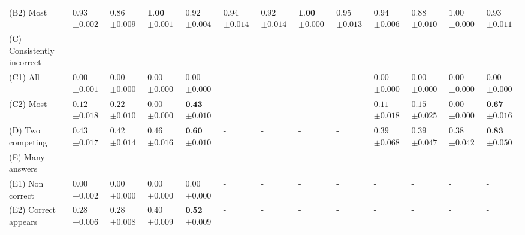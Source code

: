 \begin{table}[t]
{\begin{tabular}{l|llll|llll|llll}
         \hspace{1em} (B2) Most & $0.93$ \tiny $\pm 0.002$ & $0.86$ \tiny $\pm 0.009$ & $\textbf{1.00}$ \tiny $\pm 0.001$ & $0.92$ \tiny $\pm 0.004$ & $0.94$ \tiny $\pm 0.014$ & $0.92$ \tiny $\pm 0.014$ & $\textbf{1.00}$ \tiny $\pm 0.000$ & $0.95$ \tiny $\pm 0.013$ & $0.94$ \tiny $\pm 0.006$ & $0.88$ \tiny $\pm 0.010$ & $1.00$ \tiny $\pm 0.000$ & $0.93$ \tiny $\pm 0.011$ \\
         (C) Consistently incorrect & \\
         \hspace{1em} (C1) All & $0.00$ \tiny $\pm 0.001$ & $0.00$ \tiny $\pm 0.000$ & $0.00$ \tiny $\pm 0.000$ & $0.00$ \tiny $\pm 0.000$ & - & - & - & - & $0.00$ \tiny $\pm 0.000$ & $0.00$ \tiny $\pm 0.000$ & $0.00$ \tiny $\pm 0.000$ & $0.00$ \tiny $\pm 0.000$ \\
         \hspace{1em} (C2) Most & $0.12$ \tiny $\pm 0.018$ & $0.22$ \tiny $\pm 0.010$ & $0.00$ \tiny $\pm 0.000$ & $\textbf{0.43}$ \tiny $\pm 0.010$ & - & - & - & - & $0.11$ \tiny $\pm 0.018$ & $0.15$ \tiny $\pm 0.025$ & $0.00$ \tiny $\pm 0.000$ & $\textbf{0.67}$ \tiny $\pm 0.016$ \\
         (D) Two competing & $0.43$ \tiny $\pm 0.017$ & $0.42$ \tiny $\pm 0.014$ & $0.46$ \tiny $\pm 0.016$ & $\textbf{0.60}$ \tiny $\pm 0.010$ & - & - & - & - & $0.39$ \tiny $\pm 0.068$ & $0.39$ \tiny $\pm 0.047$ & $0.38$ \tiny $\pm 0.042$ & $\textbf{0.83}$ \tiny $\pm 0.050$ \\
         (E) Many answers & \\
         \hspace{1em} (E1) Non correct & $0.00$ \tiny $\pm 0.002$ & $0.00$ \tiny $\pm 0.000$ & $0.00$ \tiny $\pm 0.000$ & $0.00$ \tiny $\pm 0.000$ & - & - & - & - & - & - & - & - \\
         \hspace{1em} (E2) Correct appears & $0.28$ \tiny $\pm 0.006$ & $0.28$ \tiny $\pm 0.008$ & $0.40$ \tiny $\pm 0.009$ & $\textbf{0.52}$ \tiny $\pm 0.009$ & - & -& - & - & - & - & - & - \\
    \bottomrule
    \end{tabular}
    }
    \label{tab:performance_after_probing_appendix_instruct}
\end{table}
